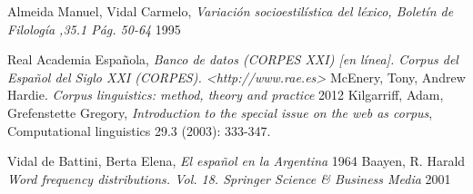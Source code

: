 \documentclass[a4paper,11pt]{article}
\begin{document}
\begin{thebibliography}{9}
     Almeida Manuel, Vidal Carmelo,
    \emph{Variación socioestilística del léxico, Boletín de Filología ,35.1 Pág. 50-64}
    1995

    Real Academia Española,
    \emph{Banco de datos (CORPES XXI) [en línea]. Corpus del Español del
    Siglo XXI (CORPES). <http://www.rae.es>}
    McEnery, Tony,  Andrew Hardie.
    \emph{Corpus linguistics: method, theory and practice}
    2012
   Kilgarriff, Adam, Grefenstette Gregory,
   \emph{Introduction to the special issue on the web as corpus},
   Computational linguistics 29.3 (2003): 333-347.

    Vidal de Battini, Berta Elena,
    \emph{El español en la Argentina}
    1964
    Baayen, R. Harald
    \emph{Word frequency distributions. Vol. 18. Springer Science \& Business Media}
    2001


\end{thebibliography}
\end{document}
